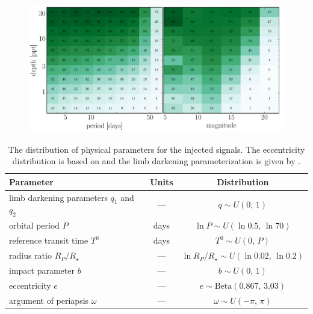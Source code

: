 \documentclass[12pt,preprint]{aastex}
\newcommand{\figlabel}[1]{\label{fig:#1}}
\newcommand{\tablabel}[1]{\label{tab:#1}}
\newcommand{\period}{{\ensuremath{P}}}
\newcommand{\phase}{{\ensuremath{T^0}}}
\newcommand{\impact}{{\ensuremath{b}}}
\newcommand{\ecc}{{\ensuremath{e}}}
\newcommand{\pomega}{{\ensuremath{\omega}}}
\begin{document}
\begin{figure}[p]
\begin{center}
\includegraphics[width=\textwidth]{figures/completeness.pdf}
\end{center}
\caption{%
\figlabel{completeness}}
\end{figure}

\clearpage

\begin{table}[p]
\begin{center}
\begin{tabular}{lcc}
\toprule
Parameter & Units & Distribution \\
\midrule

limb darkening parameters $q_1$ and $q_2$ & --- & $q \sim U(0,\,1)$ \\
orbital period \period & days & $\ln \period \sim U(\ln 0.5,\,\ln 70)$ \\
reference transit time \phase & days & $\phase \sim U(0,\,\period)$ \\
radius ratio $R_P/R_\star$ & --- & $\ln R_P/R_\star \sim U(\ln 0.02,\,\ln 0.2)$ \\
impact parameter \impact & --- & $\impact \sim U(0,\,1)$ \\
eccentricity \ecc & --- & $\ecc \sim \mathrm{Beta}(0.867,\,3.03)$ \\
argument of periapsis \pomega & --- & $\pomega \sim U(-\pi,\,\pi)$ \\

\bottomrule
\end{tabular}
\end{center}
\caption{%
The distribution of physical parameters for the injected signals.
The eccentricity distribution is based on \citet{kipping-ecc} and the
limb darkening parameterization is given by \citet{kipping-ld}.
\tablabel{dist}}
\end{table}

\begin{table}[p]
\begin{center}
\small

\end{center}
\caption{%
Candidates
\tablabel{cand}}
\end{table}

\begin{table}[p]
\begin{center}

\end{center}
\caption{%
Probable binaries. \
$^\mathrm{a}$ The period for EPIC 201161715 was estimated using the secondary
eclipses since there is only a single primary transit.
\tablabel{eb}}
\end{table}
\end{document}
